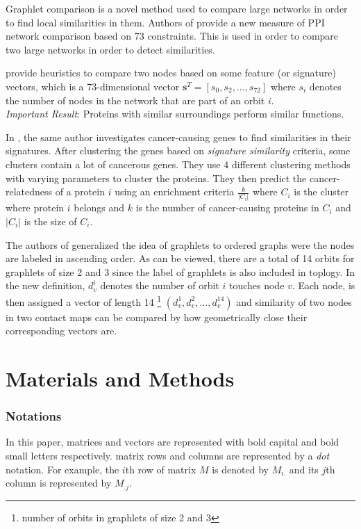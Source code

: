 \documentclass[a4,center,fleqn]{NAR}
\begin{document}
Graphlet comparison is a novel method used to compare large networks in order to
find local similarities in them.
Authors of \cite{prvzulj2007biological} provide a new measure of PPI
network comparison
based on 73 constraints. This is used in order to compare two large
networks in order to detect similarities.

\cite{milenkoviae2008uncovering} 
 provide heuristics to compare two nodes based on some feature
(or signature) vectors, which is a 73-dimensional vector
$\mathbf{s}^T
= [s_0, s_2, ..., s_{72}]$ where $s_i$ denotes the number of nodes in
the network that are part of an orbit $i$. \\
\textit{Important Result}: Proteins with similar surroundings perform
similar functions.

In \cite{milenkovic2010cancer}, the same author investigates 
cancer-causing genes to find similarities in their signatures. After
clustering the genes based on \textit{signature similarity} criteria,
some clusters contain a lot of cancerous genes.
They use 4 different clustering methods with varying parameters to cluster
the proteins. They then predict the cancer-relatedness of a protein 
$i$ using
an enrichment criteria $\frac{k}{|C_i|}$ where $C_i$ is the cluster
where protein $i$ belongs and $k$ is the number of cancer-causing
proteins in $C_i$ and $|C_i|$ is the size of $C_i$.


The authors of \cite{di2010fast} generalized the idea of graphlets to 
ordered graphs were the nodes are labeled in ascending order.
As can be viewed, there are a total of 14 orbits for graphlets of size
2 and 3 since the label of graphlets is also included in toplogy.
In the new definition, $d_v^i$ denotes the number of orbit $i$ touches 
node $v$. Each node, is then assigned a vector of length 14 
\footnote{number of orbits in graphlets of size 2 and 3}
$(d_v^1, d_v^2, ..., d_v^{14})$ 
and similarity of two nodes in two contact maps can be compared by
how geometrically close their corresponding vectors are.
\section{Materials and Methods}
\subsubsection{Notations}
In this paper, matrices and vectors are represented with bold
capital and bold small letters respectively.
matrix rows and columns are represented by a \textit{dot}
notation. For example, the $i$th row of matrix $M$ is
denoted by $M_{i.}$ and its $j$th column is represented
by $M_{.j}$.
\end{document}

